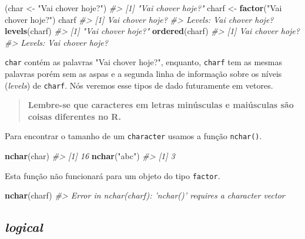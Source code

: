 \documentclass[]{book}
\newenvironment{Shaded}{\begin{snugshade}}{\end{snugshade}}
\newcommand{\KeywordTok}[1]{\textcolor[rgb]{0.13,0.29,0.53}{\textbf{#1}}}
\newcommand{\StringTok}[1]{\textcolor[rgb]{0.31,0.60,0.02}{#1}}
\newcommand{\CommentTok}[1]{\textcolor[rgb]{0.56,0.35,0.01}{\textit{#1}}}
\newcommand{\NormalTok}[1]{#1}
\begin{document}
\begin{Shaded}
\begin{Highlighting}[]
\NormalTok{(char <-}\StringTok{ "Vai chover hoje?"}\NormalTok{)}
\CommentTok{#> [1] "Vai chover hoje?"}
\NormalTok{charf <-}\StringTok{ }\KeywordTok{factor}\NormalTok{(}\StringTok{"Vai chover hoje?"}\NormalTok{)}
\NormalTok{charf}
\CommentTok{#> [1] Vai chover hoje?}
\CommentTok{#> Levels: Vai chover hoje?}
\KeywordTok{levels}\NormalTok{(charf)}
\CommentTok{#> [1] "Vai chover hoje?"}
\KeywordTok{ordered}\NormalTok{(charf)}
\CommentTok{#> [1] Vai chover hoje?}
\CommentTok{#> Levels: Vai chover hoje?}
\end{Highlighting}
\end{Shaded}

\texttt{char} contém as palavras "Vai chover hoje?", enquanto,
\texttt{charf} tem as mesmas palavras porém sem as aspas e a segunda
linha de informação sobre os níveis (\emph{levels}) de \texttt{charf}.
Nós veremos esse tipos de dado futuramente em vetores.

\begin{quote}
\textbf{Lembre-se que caracteres em letras minúsculas e maiúsculas são
coisas diferentes no R.}
\end{quote}

Para encontrar o tamanho de um \texttt{character} usamos a função
\texttt{nchar()}.

\begin{Shaded}
\begin{Highlighting}[]
\KeywordTok{nchar}\NormalTok{(char)}
\CommentTok{#> [1] 16}
\KeywordTok{nchar}\NormalTok{(}\StringTok{"abc"}\NormalTok{)}
\CommentTok{#> [1] 3}
\end{Highlighting}
\end{Shaded}

Esta função não funcionará para um objeto do tipo \texttt{factor}.

\begin{Shaded}
\begin{Highlighting}[]
\KeywordTok{nchar}\NormalTok{(charf)}
\CommentTok{#> Error in nchar(charf): 'nchar()' requires a character vector}
\end{Highlighting}
\end{Shaded}

\subsection{\texorpdfstring{\emph{logical}}{logical}}\label{logico}
\end{document}
